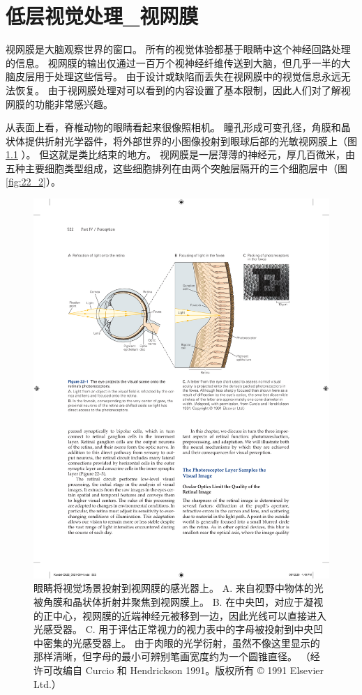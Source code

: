 \chapter{低层视觉处理\_视网膜} \label{chap:chap22}

视网膜是大脑观察世界的窗口。 
所有的视觉体验都基于眼睛中这个神经回路处理的信息。 
视网膜的输出仅通过一百万个视神经纤维传送到大脑，但几乎一半的大脑皮层用于处理这些信号。 
由于设计或缺陷而丢失在视网膜中的视觉信息永远无法恢复。 
由于视网膜处理对可以看到的内容设置了基本限制，因此人们对了解视网膜的功能非常感兴趣。


从表面上看，脊椎动物的眼睛看起来很像照相机。 
瞳孔形成可变孔径，角膜和晶状体提供折射光学器件，将外部世界的小图像投射到眼球后部的光敏视网膜上（图 \ref{fig:22_1} ）。 
但这就是类比结束的地方。 
视网膜是一层薄薄的神经元，厚几百微米，由五种主要细胞类型组成，这些细胞排列在由两个突触层隔开的三个细胞层中（图 \ref{fig:22_2}）。


\begin{figure}[htbp]
	\centering
	\includegraphics[width=1.0\linewidth]{chap22/fig_22_1}
	\caption{眼睛将视觉场景投射到视网膜的感光器上。 
		A. 来自视野中物体的光被角膜和晶状体折射并聚焦到视网膜上。 
		B. 在中央凹，对应于凝视的正中心，视网膜的近端神经元被移到一边，因此光线可以直接进入光感受器。 
		C. 用于评估正常视力的视力表中的字母被投射到中央凹中密集的光感受器上。 
		由于肉眼的光学衍射，虽然不像这里显示的那样清晰，但字母的最小可辨别笔画宽度约为一个圆锥直径。 （经许可改编自 Curcio 和 Hendrickson 1991。版权所有 © 1991 Elsevier Ltd.）}
	\label{fig:22_1}
\end{figure}

